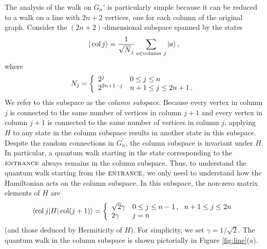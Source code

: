 \documentclass[aps,11pt,twoside,nofootinbib,tightenlines,superscriptaddress,preprintnumbers]{revtex4}
\makeatletter
\newcommand{\<}{\langle}
\renewcommand{\>}{\rangle}
\newcommand{\be}{\begin{equation}}
\newcommand{\ee}{\end{equation}}
\newcommand{\cond}[1]{\left\{\begin{array}{l@{~~~}l}#1\end{array}\right.}
\newcommand{\ent}{{\textsc{entrance}}}
\newcommand{\col}{\mathop{\mathrm{col}}\nolimits}
\makeatother
\begin{document}
The analysis of the walk on $G_n'$ is particularly simple because it can
be reduced to a walk on a line with $2n+2$ vertices, one for each column
of the original graph.  Consider the $(2n+2)$-dimensional subspace spanned
by the states
\be
  |\col j\> = {1 \over \sqrt N_j} \sum_{a \in \mathrm{column~} j} |a\>
\,,
\ee
where
\be
  N_j = \cond{2^j        &   0 \le j \le n \\
              2^{2n+1-j} & n+1 \le j \le 2n+1 \,.}
\ee
We refer to this subspace as the {\em column subspace}. Because every vertex
in column $j$ is connected to the same number of vertices in column $j+1$
and every vertex in column $j+1$ is connected to the same number of vertices
in column $j$, applying $H$ to any state in
the column subspace results in another state in this subspace.
Despite the random connections in $G^{\prime}_n$, the column subspace is 
invariant under $H$.
In particular, a quantum walk starting in the state corresponding to the
$\ent$ always remains in the column subspace.  Thus, to understand the
quantum walk starting from the $\ent$, we only need to understand how the
Hamiltonian acts on the column subspace.  In this subspace, the non-zero
matrix elements of $H$ are
\be
  \<\col j|H|\col(j+1)\> = \cond{
   \sqrt 2 \gamma & 0 \le j \le n-1 \,,~~ n+1 \le j \le 2n \\
   2 \gamma       & j=n}
\label{eq:lineham}
\ee
(and those deduced by Hermiticity of $H$).  For simplicity, we set
$\gamma=1/\sqrt2$.  The quantum walk in the column subspace is shown
pictorially in Figure \ref{fig:line}(a).
\end{document}
